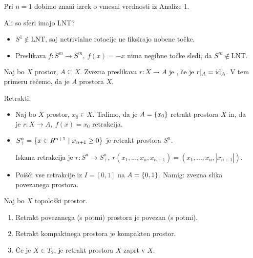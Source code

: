 \begin{zgled}
    Pri \(n=1\) dobimo znani izrek o vmesni vrednosti iz Analize 1.
\end{zgled}

\begin{primer}
    Ali so sferi imajo LNT?
    \begin{itemize}
        \item \(S^1 \notin \text{LNT} \), saj netrivialne rotacije ne fiksirajo nobene točke.
        \item Preslikava \(f: S^m \to S^m, \ f(x) = -x\) nima negibne točke sledi, da \(S^m \notin \text{LNT} \).
    \end{itemize}
\end{primer}

\begin{definicija}
    Naj bo \(X\) prostor, \(A \subseteq X\). Zvezna preslikava \(r: X \to A\) je , če je \(r|_A = \operatorname{id}_A\). V tem primeru rečemo, da je \(A\)  prostora \(X\).
\end{definicija}

\begin{primer}
    Retrakti.
    \begin{itemize}
        \item Naj bo \(X\) prostor, \(x_0 \in X\). Trdimo, da je \(A = \left\{x_0\right\}\) retrakt prostora \(X\) in, da je \(r: X \to A, \ f(x) = x_0\) retrakcija.
        \item \(S_+^n = \left\{x \in R^{n+1} \ | \ x_{n+1} \geq 0\right\}\) je retrakt prostora \(S^n\). 
        
        Iskana retrakcija je \(r: S^n \to S^n_+, \ r(x_1, \ldots, x_n,  x_{n+1}) = (x_1, \ldots, x_n, |x_{n+1}|)\). 
        \item Poišči vse retrakcije iz \(I = [0, 1]\) na \(A = \left\{0, 1\right\}\). Namig: zvezna slika povezanega prostora.
    \end{itemize}
\end{primer}

\begin{trditev}
    Naj bo \(X\) topološki prostor.
    \begin{enumerate}
        \item Retrakt povezanega (s potmi) prostora je povezan (s potmi).
        \item Retrakt kompaktnega prostora je kompakten prostor.
        \item Če je \(X \in T_2\), je retrakt prostora \(X\) zaprt v \(X\).
    \end{enumerate}
\end{trditev}

